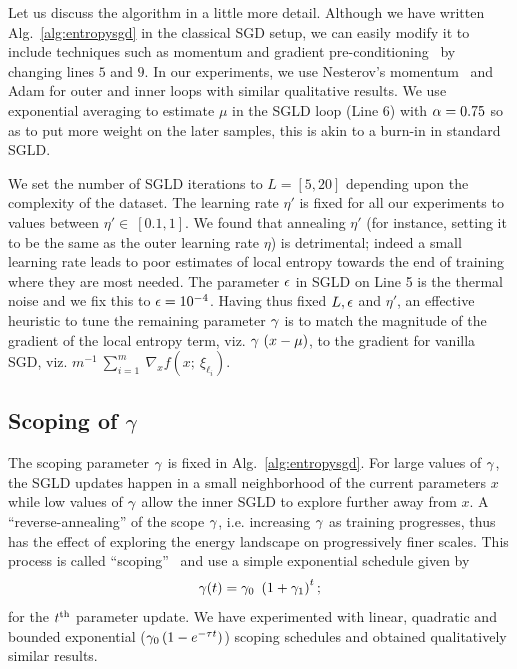 \documentclass[10pt]{article}
\begin{document}
Let us discuss the algorithm in a little more detail. Although we have written Alg.~\ref{alg:entropysgd} in the classical SGD setup, we can easily modify it to include techniques such as momentum and gradient pre-conditioning~\citep{duchi2011adaptive} by changing lines $5$ and $9$. In our experiments, we use Nesterov's momentum~\citep{sutskever2013importance} and Adam for outer and inner loops with similar qualitative results.
%
We use exponential averaging to estimate $\mu$ in the SGLD loop (Line 6) with $\alpha = 0.75$ so as to put more weight on the later samples, this is akin to a burn-in in standard SGLD.

We set the number of SGLD iterations to $L = [5, 20]$ depending upon the complexity of the dataset. The learning rate $\eta'$ is fixed for all our experiments to values between $\eta' \in\ [0.1, 1]$. We found that annealing $\eta'$ (for instance, setting it to be the same as the outer learning rate $\eta$) is detrimental; indeed a small learning rate leads to poor estimates of local entropy towards the end of training where they are most needed. The parameter $\epsilon$ in SGLD on Line 5 is the thermal noise and we fix this to $\epsilon = 10^{-4}$. Having thus fixed $L, \epsilon$ and $\eta'$, an effective heuristic to tune the remaining parameter $\gamma$ is to match the magnitude of the gradient of the local entropy term, viz. $\g\ (x - \mu)$, to the gradient for vanilla SGD, viz. $m^{-1}\ \sum_{i=1}^m\ \nabla_x f(x;\ \xi_{\ell_i})$.

\subsection{Scoping of $\gamma$}
\label{s:scoping}

The scoping parameter $\gamma$ is fixed in Alg.~\ref{alg:entropysgd}. For large values of $\gamma$, the SGLD updates happen in a small neighborhood of the current parameters $x$ while low values of $\gamma$ allow the inner SGLD to explore further away from $x$. A ``reverse-annealing'' of the scope $\gamma$, i.e. increasing $\gamma$ as training progresses, thus has the effect of exploring the energy landscape on progressively finer scales. This process is called ``scoping''~\citep{baldassi2016unreasonable} and use a simple exponential schedule given by
$$
    \g(t) = \g_0\ \rbrac{1 + \g_1}^t;
$$
for the $t^{\mathrm{th}}$ parameter update. We have experimented with linear, quadratic and bounded exponential ($\gamma_0 \left(1 - e^{-\tau t}\right)$) scoping schedules and obtained qualitatively similar results.
\end{document}
